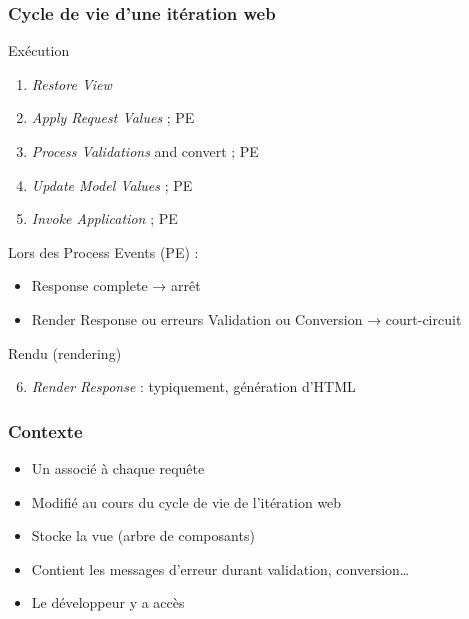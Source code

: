 \documentclass[english, french]{beamer}
\begin{document}
\begin{frame}
	\frametitle{Cycle de vie d’une itération web}
	\begin{minipage}[t]{6.8cm}\vspace{-2em}%
		\begin{block}{Exécution}
			\begin{enumerate}
				\item \emph{Restore View}
				\item \emph{Apply Request Values} ; PE
				\item \emph{Process Validations} {\tiny and convert} ; PE
				\item \emph{Update Model Values} ; PE
				\item \emph{Invoke Application} ; PE
			\end{enumerate}
		\end{block}
	\end{minipage}\hfill%
	\begin{minipage}[t]{\columnwidth - 4mm - 6.8cm}
		Lors des Process Events (PE) :
		\begin{itemize}
			\item Response complete → arrêt
			\item Render Response ou erreurs Validation ou Conversion → court-circuit
		\end{itemize}
	\end{minipage}
	\begin{block}{Rendu (rendering)}
		\begin{enumerate}\setcounter{enumi}{5}
			\item \emph{Render Response} : typiquement, génération d’HTML
		\end{enumerate}
	\end{block}
\end{frame}

\begin{frame}
	\frametitle{Contexte}
	\begin{itemize}
		\item Un  associé à chaque requête
		\item Modifié au cours du cycle de vie de l’itération web
		\item Stocke la vue (arbre de composants)
		\item Contient les messages d’erreur durant validation, conversion…
		\item Le développeur y a accès
	\end{itemize}
\end{frame}
\end{document}

